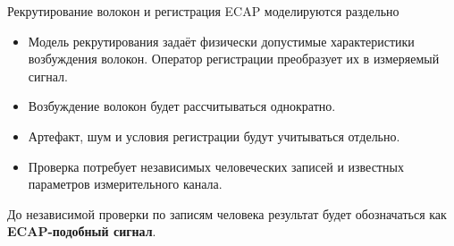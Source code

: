 \begin{frame}{Рекрутирование волокон и регистрация ECAP моделируются раздельно}
\centering
{}
\SlideGap
\raggedright
\begin{itemize}
\item Модель рекрутирования задаёт физически допустимые характеристики возбуждения волокон. Оператор регистрации преобразует их в измеряемый сигнал.
\item Возбуждение волокон будет рассчитываться однократно.
\item Артефакт, шум и условия регистрации будут учитываться отдельно.
\item Проверка потребует независимых человеческих записей и известных параметров измерительного канала.
\end{itemize}
До независимой проверки по записям человека результат будет обозначаться как \textbf{ECAP-подобный сигнал}.
\end{frame}
